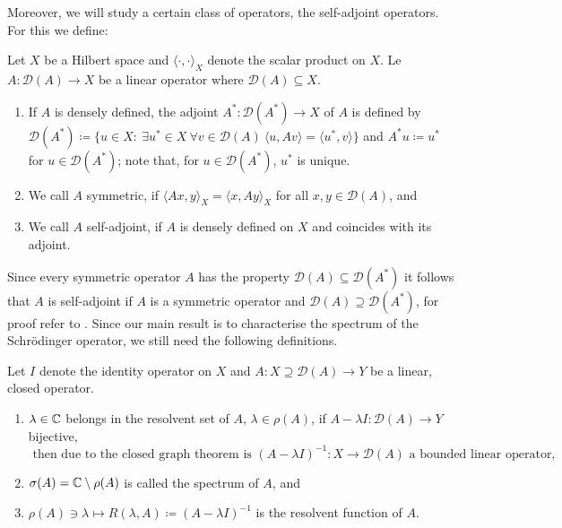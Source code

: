 Moreover, we will study a certain class of operators, the self-adjoint operators. For this we define:

\begin{definition}
Let $X$ be a Hilbert space and $\langle \cdot, \cdot \rangle_{X}$ denote the scalar product on $X$. Le $A \colon \mathcal{D}(A) \rightarrow X$ be a linear operator where $\mathcal{D}(A) \subseteq X$.
	\begin{enumerate}[label=\alph*\upshape)]
		\item If $A$ is densely defined, the adjoint $A^{*} \colon \mathcal{D}(A^{*}) \rightarrow X$ of $A$ is defined by $\mathcal{D}(A^{*}) \coloneqq \{ u \in X \colon ~\exists u^{*} \in X ~\forall v \in \mathcal{D}(A) ~\langle u, Av \rangle = \langle u^{*} , v \rangle \}$ and $A^{*} u \coloneqq u^{*}$ for $u \in \mathcal{D}(A^{*})$; note that, for $u \in \mathcal{D}(A^{*})$, $u^{*}$ is unique.
		\item We call $A$ symmetric, if $\langle Ax,y \rangle_{X} = \langle x , Ay \rangle_{X}$ for all $x,y \in \mathcal{D}(A)$, and
		\item We call $A$ self-adjoint, if $A$ is densely defined on $X$ and coincides with its adjoint.
	\end{enumerate}
\end{definition}

Since every symmetric operator $A$ has the property $\mathcal{D}(A) \subseteq \mathcal{D}(A^{*})$ it follows that $A$ is self-adjoint if $A$ is a symmetric operator and $\mathcal{D}(A) \supseteq \mathcal{D}(A^{*})$, for proof refer to \cite[page 256]{reed1908methods}. Since our main result is to characterise the spectrum of the Schrödinger operator, we still need the following definitions. 

\begin{definition}
Let $I$ denote the identity operator on $X$ and $A \colon X \supseteq \mathcal{D}(A) \rightarrow Y$ be a linear, closed operator.
	\begin{enumerate}[label=\alph*\upshape)]
		\item $\lambda \in \mathbb{C}$ belongs in the resolvent set of $A$, $\lambda \in \rho(A)$, if $A  - \lambda I \colon \mathcal{D}(A) \rightarrow Y$ bijective, 
			\[ \text{ then due to the closed graph theorem is } (A - \lambda I)^{-1} \colon X \rightarrow \mathcal{D}(A) \text{ a bounded linear operator,} \]
		\item $\sigma(A) = \mathbb{C} \setminus \rho(A)$ is called the spectrum of $A$, and
		\item $\rho(A) \ni \lambda \mapsto R(\lambda, A) \coloneqq (A - \lambda I)^{-1}$ is the resolvent function of $A$.
	\end{enumerate}		
\end{definition}

